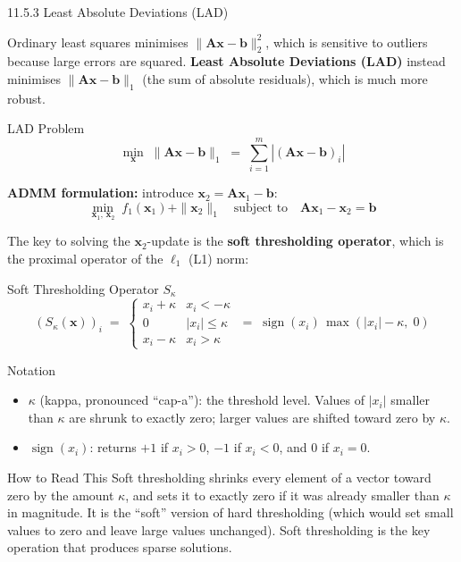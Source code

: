 \documentclass[aspectratio=169,10pt]{beamer}
\newcommand{\bx}{\mathbf{x}}
\newcommand{\bA}{\mathbf{A}}
\newcommand{\bb}{\mathbf{b}}
\begin{document}
\begin{frame}[allowframebreaks]{11.5.3 Least Absolute Deviations (LAD)}

  Ordinary least squares minimises $\|\bA\bx - \bb\|_2^2$, which is
  sensitive to outliers because large errors are squared.  \textbf{Least
  Absolute Deviations (LAD)} instead minimises $\|\bA\bx - \bb\|_1$
  (the sum of absolute residuals), which is much more robust.

  \begin{block}{LAD Problem}
    \[
      \min_{\bx}\; \|\bA\bx - \bb\|_1
      \;=\; \sum_{i=1}^m |(\bA\bx - \bb)_i|
    \]
  \end{block}

  \textbf{ADMM formulation:} introduce $\bx_2 = \bA\bx_1 - \bb$:
  \[
    \min_{\bx_1,\, \bx_2}\; f_1(\bx_1) + \|\bx_2\|_1
    \quad \text{subject to} \quad \bA\bx_1 - \bx_2 = \bb
  \]

  The key to solving the $\bx_2$-update is the \textbf{soft thresholding
  operator}, which is the proximal operator of the $\ell_1$ (L1) norm:

  \begin{block}{Soft Thresholding Operator $S_\kappa$}
    \[
      (S_\kappa(\bx))_i \;=\;
      \begin{cases}
        x_i + \kappa & x_i < -\kappa \\
        0            & |x_i| \le \kappa \\
        x_i - \kappa & x_i > \kappa
      \end{cases}
      \;=\; \operatorname{sign}(x_i)\,\max(|x_i| - \kappa,\; 0)
    \]
  \end{block}

  \begin{block}{Notation}
    \begin{itemize}
      \item $\kappa$ (kappa, pronounced ``cap-a''): the threshold level.
            Values of $|x_i|$ smaller than $\kappa$ are shrunk to exactly
            zero; larger values are shifted toward zero by $\kappa$.
      \item $\operatorname{sign}(x_i)$: returns $+1$ if $x_i > 0$,
            $-1$ if $x_i < 0$, and $0$ if $x_i = 0$.
    \end{itemize}
  \end{block}

  \begin{alertblock}{How to Read This}
    Soft thresholding shrinks every element of a vector toward zero by
    the amount $\kappa$, and sets it to exactly zero if it was already
    smaller than $\kappa$ in magnitude.  It is the ``soft'' version of
    hard thresholding (which would set small values to zero and leave
    large values unchanged).  Soft thresholding is the key operation
    that produces sparse solutions.
  \end{alertblock}


\end{frame}
\end{document}
